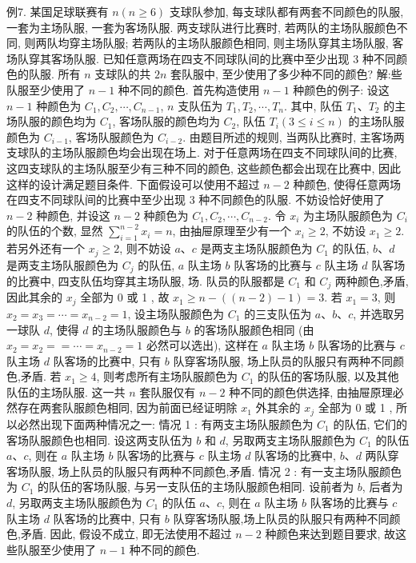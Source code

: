 例7. 某国足球联赛有 $n(n \geqslant 6)$ 支球队参加, 每支球队都有两套不同颜色的队服, 一套为主场队服, 一套为客场队服.
两支球队进行比赛时, 若两队的主场队服颜色不同, 则两队均穿主场队服; 若两队的主场队服颜色相同, 则主场队穿其主场队服, 客场队穿其客场队服.
已知任意两场在四支不同球队间的比赛中至少出现 3 种不同颜色的队服.
所有 $n$ 支球队的共 $2 n$ 套队服中, 至少使用了多少种不同的颜色?
解:些队服至少使用了 $n-1$ 种不同的颜色.
首先构造使用 $n-1$ 种颜色的例子: 设这 $n-1$ 种颜色为 $C_1, C_2, \cdots, C_{n-1}$,
$n$ 支队伍为 $T_1, T_2, \cdots, T_n$. 其中, 队伍 $T_1 、 T_2$ 的主场队服的颜色均为 $C_1$, 客场队服的颜色均为 $C_2$, 队伍 $T_i(3 \leqslant i \leqslant n)$ 的主场队服颜色为 $C_{i-1}$, 客场队服颜色为 $C_{i-2}$.
由题目所述的规则, 当两队比赛时, 主客场两支球队的主场队服颜色均会出现在场上.
对于任意两场在四支不同球队间的比赛, 这四支球队的主场队服至少有三种不同的颜色, 这些颜色都会出现在比赛中, 因此这样的设计满足题目条件.
下面假设可以使用不超过 $n-2$ 种颜色, 使得任意两场在四支不同球队间的比赛中至少出现 3 种不同颜色的队服.
不妨设恰好使用了 $n-2$ 种颜色, 并设这 $n-2$ 种颜色为 $C_1, C_2, \cdots, C_{n-2}$. 令 $x_i$ 为主场队服颜色为 $C_i$ 的队伍的个数, 显然 $\sum_{i=1}^{n-2} x_i=n$, 由抽屉原理至少有一个 $x_i \geqslant 2$, 不妨设 $x_1 \geqslant 2$.
若另外还有一个 $x_j \geqslant 2$, 则不妨设 $a 、 c$ 是两支主场队服颜色为 $C_1$ 的队伍, $b 、 d$ 是两支主场队服颜色为 $C_j$ 的队伍, $a$ 队主场 $b$ 队客场的比赛与 $c$ 队主场 $d$ 队客场的比赛中, 四支队伍均穿其主场队服, 场.
队员的队服都是 $C_1$ 和 $C_j$ 两种颜色,矛盾, 因此其余的 $x_j$ 全部为 0 或 1 , 故 $x_1 \geqslant n-((n-2)-1)=3$.
若 $x_1=3$, 则 $x_2=x_3=\cdots=x_{n-2}=1$, 设主场队服颜色为 $C_1$ 的三支队伍为 $a 、 b 、 c$, 并选取另一球队 $d$, 使得 $d$ 的主场队服颜色与 $b$ 的客场队服颜色相同 (由 $x_2=x_2==\cdots=x_{n-2}=1$ 必然可以选出), 这样在 $a$ 队主场 $b$ 队客场的比赛与 $c$ 队主场 $d$ 队客场的比赛中, 只有 $b$ 队穿客场队服, 场上队员的队服只有两种不同颜色,矛盾.
若 $x_1 \geqslant 4$, 则考虑所有主场队服颜色为 $C_1$ 的队伍的客场队服, 以及其他队伍的主场队服.
这一共 $n$ 套队服仅有 $n-2$ 种不同的颜色供选择, 由抽屉原理必然存在两套队服颜色相同, 因为前面已经证明除 $x_1$ 外其余的 $x_j$ 全部为 0 或 1 , 所以必然出现下面两种情况之一:
情况 1 : 有两支主场队服颜色为 $C_1$ 的队伍, 它们的客场队服颜色也相同.
设这两支队伍为 $b$ 和 $d$, 另取两支主场队服颜色为 $C_1$ 的队伍 $a 、 c$, 则在 $a$ 队主场 $b$ 队客场的比赛与 $c$ 队主场 $d$ 队客场的比赛中, $b 、 d$ 两队穿客场队服, 场上队员的队服只有两种不同颜色,矛盾.
情况 2 : 有一支主场队服颜色为 $C_1$ 的队伍的客场队服, 与另一支队伍的主场队服颜色相同.
设前者为 $b$, 后者为 $d$, 另取两支主场队服颜色为 $C_1$ 的队伍 $a 、 c$, 则在 $a$ 队主场 $b$ 队客场的比赛与 $c$ 队主场 $d$ 队客场的比赛中, 只有 $b$ 队穿客场队服,场上队员的队服只有两种不同颜色,矛盾.
因此, 假设不成立, 即无法使用不超过 $n-2$ 种颜色来达到题目要求, 故这些队服至少使用了 $n-1$ 种不同的颜色.


